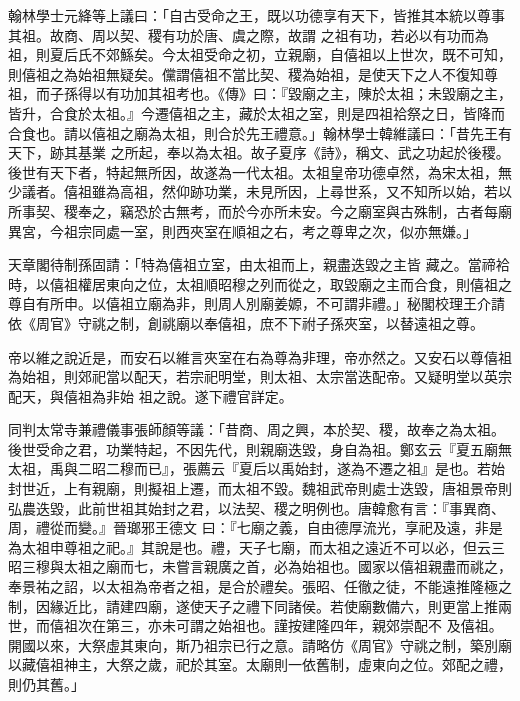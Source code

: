 \begin{pinyinscope}
 翰林學士元絳等上議曰：「自古受命之王，既以功德享有天下，皆推其本統以尊事其祖。故商、周以契、稷有功於唐、虞之際，故謂
 之祖有功，若必以有功而為祖，則夏后氏不郊鯀矣。今太祖受命之初，立親廟，自僖祖以上世次，既不可知，則僖祖之為始祖無疑矣。儻謂僖祖不當比契、稷為始祖，是使天下之人不復知尊祖，而子孫得以有功加其祖考也。《傳》曰：『毀廟之主，陳於太祖；未毀廟之主，皆升，合食於太祖。』今遷僖祖之主，藏於太祖之室，則是四祖袷祭之日，皆降而合食也。請以僖祖之廟為太祖，則合於先王禮意。」翰林學士韓維議曰：「昔先王有天下，跡其基業
 之所起，奉以為太祖。故子夏序《詩》，稱文、武之功起於後稷。後世有天下者，特起無所因，故遂為一代太祖。太祖皇帝功德卓然，為宋太祖，無少議者。僖祖雖為高祖，然仰跡功業，未見所因，上尋世系，又不知所以始，若以所事契、稷奉之，竊恐於古無考，而於今亦所未安。今之廟室與古殊制，古者每廟異宮，今祖宗同處一室，則西夾室在順祖之右，考之尊卑之次，似亦無嫌。」



 天章閣待制孫固請：「特為僖祖立室，由太祖而上，親盡迭毀之主皆
 藏之。當禘袷時，以僖祖權居東向之位，太祖順昭穆之列而從之，取毀廟之主而合食，則僖祖之尊自有所申。以僖祖立廟為非，則周人別廟姜嫄，不可謂非禮。」秘閣校理王介請依《周官》守祧之制，創祧廟以奉僖祖，庶不下祔子孫夾室，以替遠祖之尊。



 帝以維之說近是，而安石以維言夾室在右為尊為非理，帝亦然之。又安石以尊僖祖為始祖，則郊祀當以配天，若宗祀明堂，則太祖、太宗當迭配帝。又疑明堂以英宗配天，與僖祖為非始
 祖之說。遂下禮官詳定。



 同判太常寺兼禮儀事張師顏等議：「昔商、周之興，本於契、稷，故奉之為太祖。後世受命之君，功業特起，不因先代，則親廟迭毀，身自為祖。鄭玄云『夏五廟無太祖，禹與二昭二穆而已』，張薦云『夏后以禹始封，遂為不遷之祖』是也。若始封世近，上有親廟，則擬祖上遷，而太祖不毀。魏祖武帝則處士迭毀，唐祖景帝則弘農迭毀，此前世祖其始封之君，以法契、稷之明例也。唐韓愈有言：『事異商、周，禮從而變。』晉瑯邪王德文
 曰：『七廟之義，自由德厚流光，享祀及遠，非是為太祖申尊祖之祀。』其說是也。禮，天子七廟，而太祖之遠近不可以必，但云三昭三穆與太祖之廟而七，未嘗言親廣之首，必為始祖也。國家以僖祖親盡而祧之，奉景祐之詔，以太祖為帝者之祖，是合於禮矣。張昭、任徹之徒，不能遠推隆極之制，因緣近比，請建四廟，遂使天子之禮下同諸侯。若使廟數備六，則更當上推兩世，而僖祖次在第三，亦未可謂之始祖也。謹按建隆四年，親郊崇配不
 及僖祖。開國以來，大祭虛其東向，斯乃祖宗已行之意。請略仿《周官》守祧之制，築別廟以藏僖祖神主，大祭之歲，祀於其室。太廟則一依舊制，虛東向之位。郊配之禮，則仍其舊。」




\end{pinyinscope}
